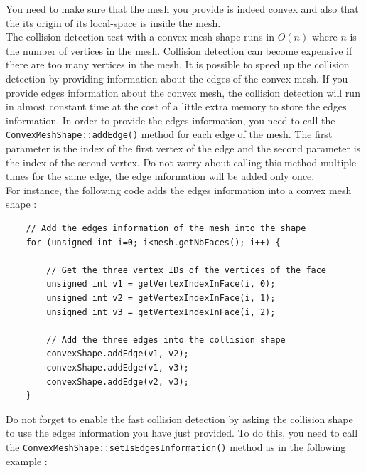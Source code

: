\documentclass[a4paper,12pt]{article}
\begin{document}
    \vspace{0.6cm}

    You need to make sure that the mesh you provide is indeed convex and also that the its origin of its local-space is inside the mesh. \\

    The collision detection test with a convex mesh shape runs in $O(n)$ where $n$ is the number of vertices in the mesh. Collision detection can become expensive if there are
    too many vertices in the mesh. It is possible to speed up the collision detection by providing information about the edges of the convex mesh. If you provide edges information
    about the convex mesh, the collision detection will run in almost constant time at the cost of a little extra memory to store the edges information. In order to provide the edges
    information, you need to call the \texttt{ConvexMeshShape::addEdge()} method for each edge of the mesh. The first parameter is the index of the first vertex of the edge and the
    second parameter is the index of the second vertex. Do not worry about calling this method multiple times for the same edge, the edge information will be added only
    once. \\

    For instance, the following code adds the edges information into a convex mesh shape : \\

    \begin{lstlisting}
    // Add the edges information of the mesh into the shape
    for (unsigned int i=0; i<mesh.getNbFaces(); i++) {

        // Get the three vertex IDs of the vertices of the face
        unsigned int v1 = getVertexIndexInFace(i, 0);
        unsigned int v2 = getVertexIndexInFace(i, 1);
        unsigned int v3 = getVertexIndexInFace(i, 2);

        // Add the three edges into the collision shape
        convexShape.addEdge(v1, v2);
        convexShape.addEdge(v1, v3);
        convexShape.addEdge(v2, v3);
    }
  \end{lstlisting}

    \vspace{0.6cm}

    Do not forget to enable the fast collision detection by asking the collision shape to use the edges information you have just provided. To do this, you need to
    call the \texttt{ConvexMeshShape::setIsEdgesInformation()} method as in the following example : \\
\end{document}
